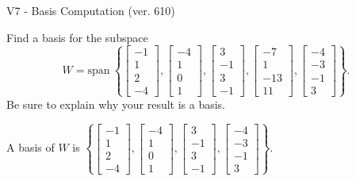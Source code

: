 \begin{exercise}
  \begin{exerciseTitle}V7 - Basis Computation (ver. 610)\end{exerciseTitle}
  \begin{exerciseStatement}
    Find a basis for the subspace 
\[W=\mathrm{span}\ \left\{\left[\begin{array}{r}
-1 \\
1 \\
2 \\
-4
\end{array}\right] , \left[\begin{array}{r}
-4 \\
1 \\
0 \\
1
\end{array}\right] , \left[\begin{array}{r}
3 \\
-1 \\
3 \\
-1
\end{array}\right] , \left[\begin{array}{r}
-7 \\
1 \\
-13 \\
11
\end{array}\right] , \left[\begin{array}{r}
-4 \\
-3 \\
-1 \\
3
\end{array}\right]\right\}.\]
 Be sure to explain why your result is a basis.


  \end{exerciseStatement}
  \begin{exerciseAnswer}
   A basis of \(W\) is  \(\left\{\left[\begin{array}{r}
-1 \\
1 \\
2 \\
-4
\end{array}\right] , \left[\begin{array}{r}
-4 \\
1 \\
0 \\
1
\end{array}\right] , \left[\begin{array}{r}
3 \\
-1 \\
3 \\
-1
\end{array}\right] , \left[\begin{array}{r}
-4 \\
-3 \\
-1 \\
3
\end{array}\right]\right\}\).
  


  \end{exerciseAnswer}
\end{exercise}